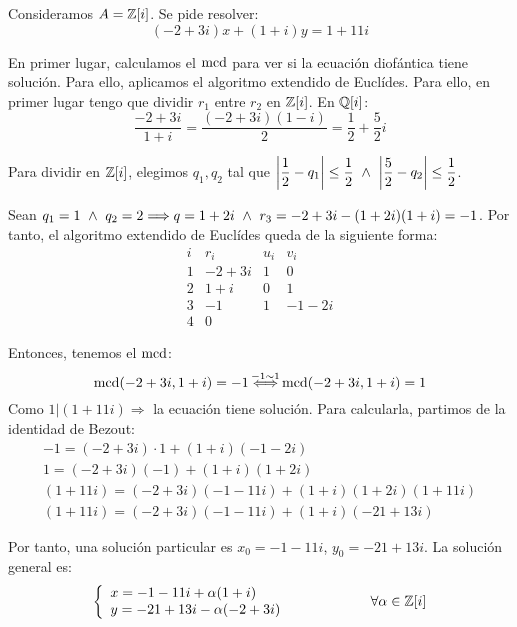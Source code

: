 \begin{ejemplo}
    Consideramos $A = \mathbb Z[i]$. Se pide resolver:
    $$(-2+3i)x + (1+i)y = 1+11i$$

    En primer lugar, calculamos el $\operatorname{mcd}$ para ver si la ecuación diofántica tiene solución. Para ello, aplicamos el algoritmo extendido de Euclídes. Para ello, en primer lugar tengo que dividir $r_1$ entre $r_2$ en $\mathbb Z[i]$. En $\mathbb Q[i]$:
    $$\dfrac{-2+3i}{1+i} = \dfrac{(-2+3i)(1-i)}{2} = \dfrac{1}{2} + \dfrac{5}{2}i$$
    
    Para dividir en $\mathbb Z[i]$, elegimos $q_1, q_2$ tal que $\left|\dfrac{1}{2}-q_1\right|\leq \dfrac{1}{2} \ \land \  \left|\dfrac{5}{2}-q_2\right|\leq \dfrac{1}{2}$.
    
    Sean $q_1 = 1 \ \land \  q_2 = 2 \Longrightarrow q = 1+2i \ \land \  r_3 = -2+3i - (1+2i)(1+i) = -1$. Por tanto, el algoritmo extendido de Euclídes queda de la siguiente forma:
    $$\begin{array}{c|c|c|c}
            i & r_i   & u_i & v_i    \\
            \hline
            1 & -2+3i & 1   & 0      \\
            2 & 1+i   & 0   & 1      \\
            3 & -1    & 1   & -1 -2i \\
            4 & 0     &     &
        \end{array}$$

    Entonces, tenemos el $\operatorname{mcd}$:
    $$\operatorname{mcd}(-2+3i, 1+i) = -1 \mathop{\Longleftrightarrow}^{-1 \sim 1} \operatorname{mcd}(-2+3i, 1+i) = 1$$
    Como $1|(1+11i) \Longrightarrow$ la ecuación tiene solución. Para calcularla, partimos de la identidad de Bezout:
    \begin{gather*}
        -1 = (-2+3i) \cdot 1 + (1+i)(-1-2i) \\
        1 = (-2+3i)(-1) + (1+i)(1+2i) \\
        (1+11i) = (-2+3i)(-1-11i) + (1+i)(1+2i)(1+11i) \\
        (1+11i) = (-2+3i)(-1-11i) + (1+i)(-21+13i)
    \end{gather*}
    
    Por tanto, una solución particular es $x_0 = -1-11i$, $y_0 = -21+13i$. La solución general es:
    \begin{equation*}
        \left\{\begin{array}{l}
            x=-1-11i + \alpha(1+i) \\
            y=-21+13i-\alpha(-2+3i)
        \end{array}\right.
        \hspace{2cm}
        \forall \alpha \in \mathbb Z[i]
    \end{equation*}
\end{ejemplo}

